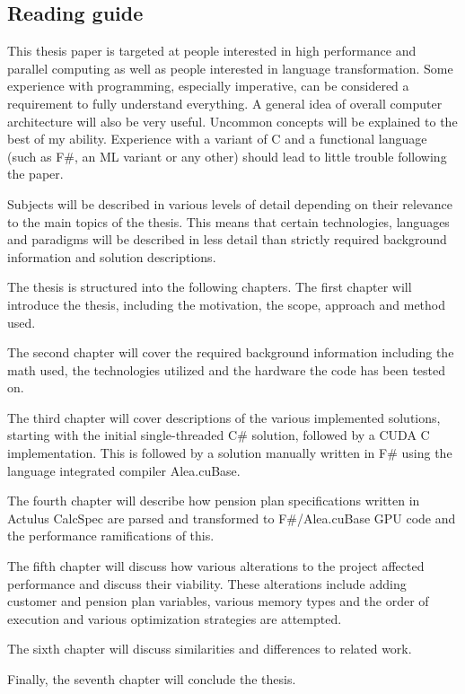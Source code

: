 \subsection{Reading guide}
This thesis paper is targeted at people interested in high performance and parallel computing as well as people interested in language transformation. 
Some experience with programming, especially imperative, can be considered a requirement to fully understand everything. 
A general idea of overall computer architecture will also be very useful. 
Uncommon concepts will be explained to the best of my ability. 
Experience with a variant of C and a functional language (such as F\#, an ML variant or any other) should lead to little trouble following the paper.

Subjects will be described in various levels of detail depending on their relevance to the main topics of the thesis.
This means that certain technologies, languages and paradigms will be described in less detail than strictly required background information and solution descriptions.

The thesis is structured into the following chapters.
The first chapter will introduce the thesis, including the motivation, the scope, approach and method used.

The second chapter will cover the required background information including the math used, the technologies utilized and the hardware the code has been tested on.

The third chapter will cover descriptions of the various implemented solutions, starting with the initial single-threaded C\# solution, followed by a CUDA C implementation. 
This is followed by a solution manually written in F\# using the language integrated compiler Alea.cuBase.

The fourth chapter will describe how pension plan specifications written in Actulus CalcSpec are parsed and transformed to F\#/Alea.cuBase GPU code and the performance ramifications of this.

The fifth chapter will discuss how various alterations to the project affected performance and discuss their viability. 
These alterations include adding customer and pension plan variables, various memory types and the order of execution and various optimization strategies are attempted.

The sixth chapter will discuss similarities and differences to related work.

Finally, the seventh chapter will conclude the thesis.